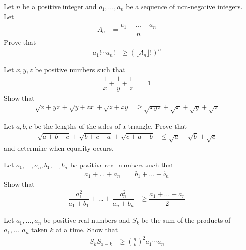 \documentclass{subfile}
\begin{document}
		\begin{problem}
			Let $n$ be a positive integer and $a_{1},\ldots,a_{n}$ be a sequence of non-negative integers. Let
				\begin{align*}
					A_{n}
						& = \dfrac{a_{1}+\ldots+a_{n}}{n}
				\end{align*}
			Prove that
				\begin{align*}
					a_{1}!\cdots a_{n}!
						& \geq (\lfloor A_{n}\rfloor!)^{n}
				\end{align*}
		\end{problem}
	
		\begin{problem}
			Let $x,y,z$ be positive numbers such that
				\begin{align*}
					\dfrac{1}{x}+\dfrac{1}{y}+\dfrac{1}{z}
						& = 1
				\end{align*}
			Show that
				\begin{align*}
					\sqrt{x+yz}+\sqrt{y+zx}+\sqrt{z+xy}
						& \geq\sqrt{xyz}+\sqrt{x}+\sqrt{y}+\sqrt{z}
				\end{align*}
		\end{problem}
	
		\begin{problem}
			Let $a,b,c$ be the lengths of the sides of a triangle. Prove that
				\begin{align*}
					\sqrt{a+b-c}+\sqrt{b+c-a}+\sqrt{c+a-b}
						& \leq \sqrt{a}+\sqrt{b}+\sqrt{c}
				\end{align*}
			and determine when equality occurs.
		\end{problem}
	
		\begin{problem}
			Let $a_{1},\ldots,a_{n},b_{1},\ldots,b_{n}$ be positive real numbers such that
				\begin{align*}
					a_{1}+\ldots+a_{n}
						& = b_{1}+\ldots+b_{n}
				\end{align*}
			Show that
				\begin{align*}
					\dfrac{a_{1}^{2}}{a_{1}+b_{1}}+\ldots+\dfrac{a_{n}^{2}}{a_{n}+b_{n}}
						& \geq\dfrac{a_{1}+\ldots+a_{n}}{2}
				\end{align*}
		\end{problem}
	
		\begin{problem}
			Let $a_{1},\ldots,a_{n}$ be positive real numbers and $S_{k}$ be the sum of the products of $a_{1},\ldots,a_{n}$ taken $k$ at a time. Show that
				\begin{align*}
					S_{k}S_{n-k}
						& \geq\binom{n}{k}^{2}a_{1}\cdots a_{n}
				\end{align*}
		\end{problem}
	
\end{document}
